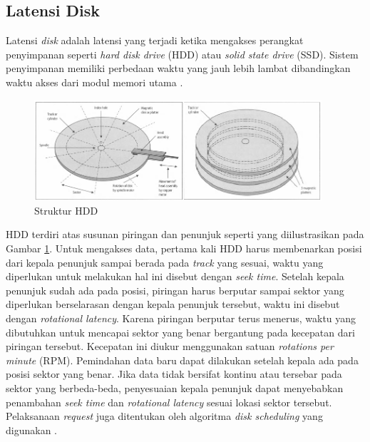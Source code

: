 \subsection{Latensi Disk}
\label{sec:latensi-disk}

Latensi \textit{disk} adalah latensi yang terjadi ketika mengakses perangkat penyimpanan seperti \textit{hard disk drive} (HDD) atau \textit{solid state drive} (SSD). Sistem penyimpanan memiliki perbedaan waktu yang jauh lebih lambat dibandingkan waktu akses dari modul memori utama \parencite{ng1991improving}.

\begin{figure}[ht]
  \centering
  \includegraphics[width=0.95\textwidth]{resources/chapter-2/disk-structure.png}
  \caption{Struktur HDD \parencite{sammes2000disk}}
  \label{fig:hdd-structure}
\end{figure}


HDD terdiri atas susunan piringan dan penunjuk seperti yang diilustrasikan pada Gambar \ref{fig:hdd-structure}. Untuk mengakses data, pertama kali HDD harus membenarkan posisi dari kepala penunjuk sampai berada pada \textit{track} yang sesuai, waktu yang diperlukan untuk melakukan hal ini disebut dengan \textit{seek time}. Setelah kepala penunjuk sudah ada pada posisi, piringan harus berputar sampai sektor yang diperlukan berselarasan dengan kepala penunjuk tersebut, waktu ini disebut dengan \textit{rotational latency}. Karena piringan berputar terus menerus, waktu yang dibutuhkan untuk mencapai sektor yang benar bergantung pada kecepatan dari piringan tersebut. Kecepatan ini diukur menggunakan satuan \textit{rotations per minute} (RPM). Pemindahan data baru dapat dilakukan setelah kepala ada pada posisi sektor yang benar. Jika data tidak bersifat kontinu atau tersebar pada sektor yang berbeda-beda, penyesuaian kepala penunjuk dapat menyebabkan penambahan \textit{seek time} dan \textit{rotational latency} sesuai lokasi sektor tersebut. Pelaksanaan \textit{request} juga ditentukan oleh algoritma \textit{disk scheduling} yang digunakan \parencite{arpaci2018operating}.

